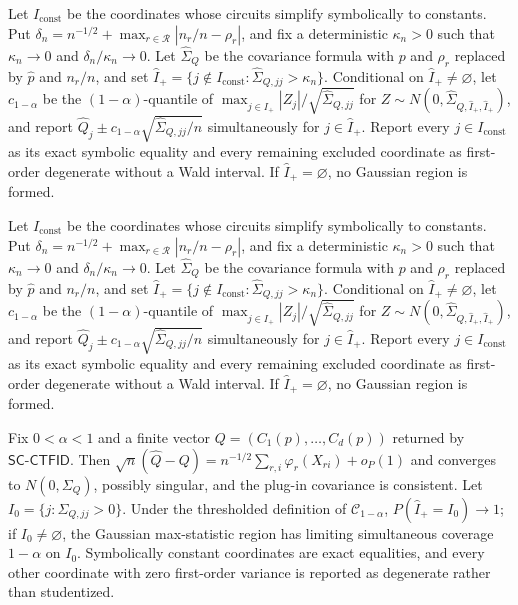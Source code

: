 Let \(I_{\mathrm{const}}\) be the coordinates whose circuits simplify symbolically to constants.  Put \(\delta_n=n^{-1/2}+\max_{r\in\mathcal R}|n_r/n-\rho_r|\), and fix a deterministic \(\kappa_n>0\) such that \(\kappa_n\to0\) and \(\delta_n/\kappa_n\to0\).  Let \(\widehat\Sigma_Q\) be the covariance formula with \(p\) and \(\rho_r\) replaced by \(\widehat p\) and \(n_r/n\), and set \(\widehat I_+=\{j\notin I_{\mathrm{const}}:\widehat\Sigma_{Q,jj}>\kappa_n\}\).  Conditional on \(\widehat I_+\ne\varnothing\), let \(c_{1-\alpha}\) be the \((1-\alpha)\)-quantile of \(\max_{j\in\widehat I_+}|Z_j|/\sqrt{\widehat\Sigma_{Q,jj}}\) for \(Z\sim N(0,\widehat\Sigma_{Q,\widehat I_+,\widehat I_+})\), and report \(\widehat Q_j\pm c_{1-\alpha}\sqrt{\widehat\Sigma_{Q,jj}/n}\) simultaneously for \(j\in\widehat I_+\).  Report every \(j\in I_{\mathrm{const}}\) as its exact symbolic equality and every remaining excluded coordinate as first-order degenerate without a Wald interval.  If \(\widehat I_+=\varnothing\), no Gaussian region is formed.

Let \(I_{\mathrm{const}}\) be the coordinates whose circuits simplify symbolically to constants.  Put \(\delta_n=n^{-1/2}+\max_{r\in\mathcal R}|n_r/n-\rho_r|\), and fix a deterministic \(\kappa_n>0\) such that \(\kappa_n\to0\) and \(\delta_n/\kappa_n\to0\).  Let \(\widehat\Sigma_Q\) be the covariance formula with \(p\) and \(\rho_r\) replaced by \(\widehat p\) and \(n_r/n\), and set \(\widehat I_+=\{j\notin I_{\mathrm{const}}:\widehat\Sigma_{Q,jj}>\kappa_n\}\).  Conditional on \(\widehat I_+\ne\varnothing\), let \(c_{1-\alpha}\) be the \((1-\alpha)\)-quantile of \(\max_{j\in\widehat I_+}|Z_j|/\sqrt{\widehat\Sigma_{Q,jj}}\) for \(Z\sim N(0,\widehat\Sigma_{Q,\widehat I_+,\widehat I_+})\), and report \(\widehat Q_j\pm c_{1-\alpha}\sqrt{\widehat\Sigma_{Q,jj}/n}\) simultaneously for \(j\in\widehat I_+\).  Report every \(j\in I_{\mathrm{const}}\) as its exact symbolic equality and every remaining excluded coordinate as first-order degenerate without a Wald interval.  If \(\widehat I_+=\varnothing\), no Gaussian region is formed.

Fix \(0<\alpha<1\) and a finite vector \(Q=(C_1(p),\ldots,C_d(p))\) returned by \(\mathsf{SC\mbox{-}CTFID}\).  Then \(\sqrt n(\widehat Q-Q)=n^{-1/2}\sum_{r,i}\varphi_r(X_{ri})+o_P(1)\) and converges to \(N(0,\Sigma_Q)\), possibly singular, and the plug-in covariance is consistent.  Let \(I_0=\{j:\Sigma_{Q,jj}>0\}\).  Under the thresholded definition of \(\mathcal C_{1-\alpha}\), \(P(\widehat I_+=I_0)\to1\); if \(I_0\ne\varnothing\), the Gaussian max-statistic region has limiting simultaneous coverage \(1-\alpha\) on \(I_0\).  Symbolically constant coordinates are exact equalities, and every other coordinate with zero first-order variance is reported as degenerate rather than studentized.

